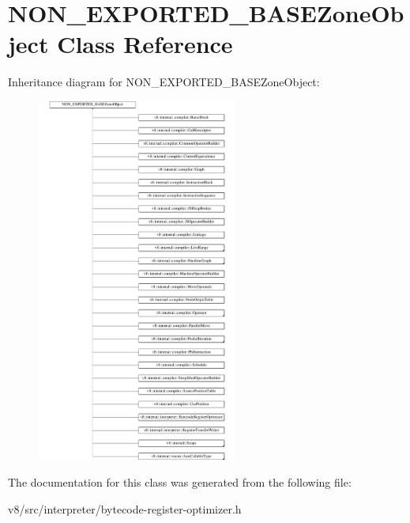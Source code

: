 \hypertarget{classNON__EXPORTED__BASEZoneObject}{}\section{N\+O\+N\+\_\+\+E\+X\+P\+O\+R\+T\+E\+D\+\_\+\+B\+A\+S\+E\+Zone\+Object Class Reference}
\label{classNON__EXPORTED__BASEZoneObject}
Inheritance diagram for N\+O\+N\+\_\+\+E\+X\+P\+O\+R\+T\+E\+D\+\_\+\+B\+A\+S\+E\+Zone\+Object\+:\begin{figure}[H]
\begin{center}
\leavevmode
\includegraphics[height=12.000000cm]{classNON__EXPORTED__BASEZoneObject}
\end{center}
\end{figure}


The documentation for this class was generated from the following file\+:\begin{DoxyCompactItemize}
\item 
v8/src/interpreter/bytecode-\/register-\/optimizer.\+h\end{DoxyCompactItemize}

